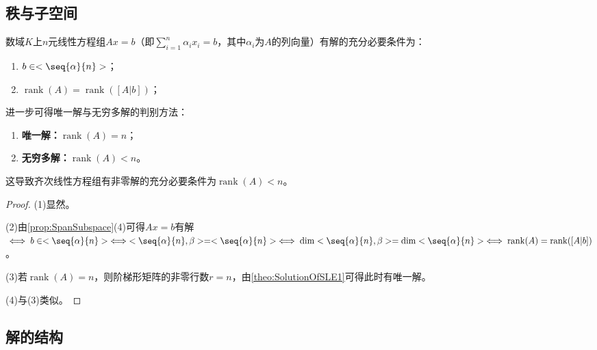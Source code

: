 \subsection{秩与子空间}
\begin{theorem}\label{theo:SolutionOfSLE2}
	数域$K$上$n$元线性方程组$Ax=b$（即$\sum\limits_{i=1}^{n}\alpha_ix_i=b$，其中$\alpha_i$为$A$的列向量）有解的充分必要条件为：
	\begin{enumerate}
		\item $b\in<\seq{\alpha}{n}>$；
		\item $\operatorname{rank}(A)=\operatorname{rank}([A|b])$；
	\end{enumerate}
	进一步可得唯一解与无穷多解的判别方法：
	\begin{enumerate}
		\item \textbf{唯一解：}$\operatorname{rank}(A)=n$；
		\item \textbf{无穷多解：}$\operatorname{rank}(A)<n$。
	\end{enumerate}
	这导致齐次线性方程组有非零解的充分必要条件为$\operatorname{rank}(A)<n$。
\end{theorem}
\begin{proof}
	(1)显然。\par
	(2)由\cref{prop:SpanSubspace}(4)可得$Ax=b$有解$\iff b\in<\seq{\alpha}{n}>\iff<\seq{\alpha}{n},\beta>=<\seq{\alpha}{n}>\iff\dim<\seq{\alpha}{n},\beta>=\dim<\seq{\alpha}{n}>\iff\operatorname{rank}(A)=\operatorname{rank}([A|b])$。\par
	(3)若$\operatorname{rank}(A)=n$，则阶梯形矩阵的非零行数$r=n$，由\cref{theo:SolutionOfSLE1}可得此时有唯一解。\par
	(4)与(3)类似。
\end{proof}
\subsection{解的结构}
